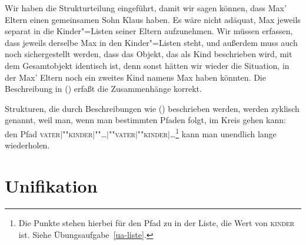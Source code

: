 Wir haben die Strukturteilung eingeführt, damit wir sagen können, dass
Max' Eltern einen gemeinsamen Sohn Klaus haben. Es wäre nicht adäquat,
Max jeweils separat in die Kinder"=Listen seiner Eltern aufzunehmen.
Wir müssen erfassen, dass jeweils derselbe Max in den Kinder"=Listen
steht, und außerdem muss auch noch sichergestellt werden, dass das
Objekt, das als Kind beschrieben wird, mit dem Gesamtobjekt identisch
ist, denn sonst hätten wir wieder die Situation, in der Max' Eltern
noch ein zweites Kind namens Max haben könnten.
Die Beschreibung in () erfaßt die Zusammenhänge korrekt.
\begin{figure}[htbp]
\ea
\label{bsp-avm-zyklen}
 
\z
\vspace{-\baselineskip}\end{figure}
Strukturen, die durch Beschreibungen wie () beschrieben werden, werden zyklisch genannt, weil man, wenn man bestimmten
Pfaden folgt, im Kreis gehen kann: \ZB den Pfad \textsc{vater$|$""kinder$|$""\ldots$|$""vater$|$""kinder$|$\ldots}\footnote{
  Die Punkte stehen hierbei für den Pfad zu  in der Liste, die
  Wert von \textsc{kinder} ist. Siehe Übungsaufgabe~\ref{ua-liste}.%
}
kann man unendlich lange wiederholen.

\section{Unifikation}
\label{sec-unifikation}

